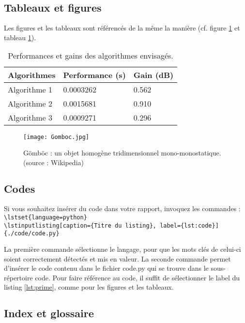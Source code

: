 \subsection{Tableaux et figures}
Les figures  et les tableaux  sont référencés de la même la manière (cf. figure \ref{fig:gomboc} et tableau \ref{tab:exemple}).  

\begin{table}[h]
\centering
\begin{tabular}{lll}
\toprule
\textbf{Algorithmes} & \textbf{Performance (s)} & \textbf{Gain (dB)}\\
\midrule
Algorithme 1 & 0.0003262 & 0.562 \\
Algorithme 2 & 0.0015681 & 0.910 \\
Algorithme 3 & 0.0009271 & 0.296 \\
\bottomrule
\end{tabular}
\caption{\label{tab:exemple}Performances et gains des algorithmes envisagés.}
\end{table}

\begin{figure}[h]
\centering\texttt{[image: Gomboc.jpg]}
\caption{\label{fig:gomboc}Gömböc : un objet homogène tridimensionnel mono-monostatique. (source : Wikipedia)}
\end{figure}



\subsection{Codes}
Si vous souhaitez insérer du code dans votre rapport, invoquez les commandes : \\
 \texttt{\textbackslash lstset\{language=python\}}\\
 \texttt{\textbackslash lstinputlisting[caption=\{Titre du listing\}, label=\{lst:code\}]\{./code/code.py\}}


La première commande sélectionne le langage, pour que les mots clés de celui-ci soient correctement détectés et mis en valeur. 
La seconde commande permet d'insérer le code contenu dans le fichier code.py qui se trouve dans le sous-répertoire code.
Pour faire référence au code, il suffit de sélectionner le label du listing \ref{lst:prime},  comme pour les figures et les tableaux.

\lstset{language=python}



\subsection{Index et glossaire}

